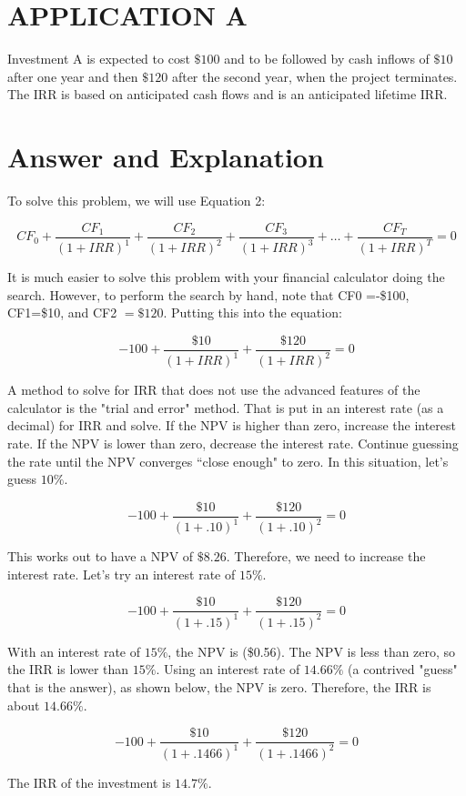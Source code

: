 \documentclass[11pt]{article}
\begin{document}
\section*{APPLICATION A}
Investment A is expected to cost $\$ 100$ and to be followed by cash inflows of $\$ 10$ after one year and then $\$ 120$ after the second year, when the project terminates. The IRR is based on anticipated cash flows and is an anticipated lifetime IRR.

\section*{Answer and Explanation}
To solve this problem, we will use Equation 2:

$$
C F_{0}+\frac{C F_{1}}{(1+I R R)^{1}}+\frac{C F_{2}}{(1+I R R)^{2}}+\frac{C F_{3}}{(1+I R R)^{3}}+\ldots+\frac{C F_{T}}{(1+I R R)^{T}}=0
$$

It is much easier to solve this problem with your financial calculator doing the search. However, to perform the search by hand, note that CF0 =-\$100, CF1=\$10, and CF2 $=\$ 120$. Putting this into the equation:

$$
-100+\frac{\$ 10}{(1+I R R)^{1}}+\frac{\$ 120}{(1+I R R)^{2}}=0
$$

A method to solve for IRR that does not use the advanced features of the calculator is the "trial and error" method. That is put in an interest rate (as a decimal) for IRR and solve. If the NPV is higher than zero, increase the interest rate. If the NPV is lower than zero, decrease the interest rate. Continue guessing the rate until the NPV converges “close enough" to zero. In this situation, let's guess $10 \%$.

$$
-100+\frac{\$ 10}{(1+.10)^{1}}+\frac{\$ 120}{(1+.10)^{2}}=0
$$

This works out to have a NPV of $\$ 8.26$. Therefore, we need to increase the interest rate. Let's try an interest rate of $15 \%$.

$$
-100+\frac{\$ 10}{(1+.15)^{1}}+\frac{\$ 120}{(1+.15)^{2}}=0
$$

With an interest rate of $15 \%$, the NPV is (\$0.56). The NPV is less than zero, so the IRR is lower than $15 \%$. Using an interest rate of $14.66 \%$ (a contrived "guess" that is the answer), as shown below, the NPV is zero. Therefore, the IRR is about $14.66 \%$.

$$
-100+\frac{\$ 10}{(1+.1466)^{1}}+\frac{\$ 120}{(1+.1466)^{2}}=0
$$

The IRR of the investment is $14.7 \%$.
\end{document}

